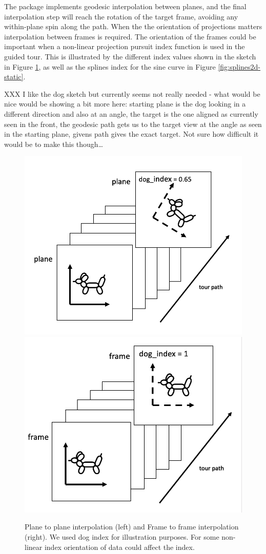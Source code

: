 The  package implements geodesic interpolation between planes, and the final interpolation step will reach the rotation of the target frame, avoiding any within-plane spin along the path. When the the orientation of projections matters interpolation between frames is required. The orientation of the frames could be important when a non-linear projection pursuit index function is used in the guided tour. This is illustrated by the different index values shown in the sketch in Figure \ref{fig:dogs}, as well as the splines index for the sine curve in Figure \ref{fig:splines2d-static}.

XXX I like the dog sketch but currently seems not really needed - what would be nice would be showing a bit more here: starting plane is the dog looking in a different direction and also at an angle, the target is the one aligned as currently seen in the front, the geodesic path gets us to the target view at the angle as seen in the starting plane, givens path gives the exact target. Not sure how difficult it would be to make this though\ldots{}

\begin{figure}

{\centering \includegraphics[width=0.45\linewidth]{figures/plane} \includegraphics[width=0.45\linewidth]{figures/frame} 

}

\caption{Plane to plane interpolation (left) and Frame to frame interpolation (right). We used dog index for illustration purposes. For some non-linear index orientation of data could affect the index.}\label{fig:dogs}
\end{figure}

